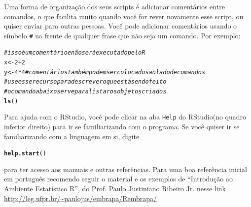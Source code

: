 \documentclass[a4paper,12pt]{article}\usepackage[]{graphicx}\usepackage[]{color}
\makeatletter
\newcommand{\hlnum}[1]{\textcolor[rgb]{0.686,0.059,0.569}{#1}}%
\newcommand{\hlcom}[1]{\textcolor[rgb]{0.498,0.498,0.498}{\textit{#1}}}%
\newcommand{\hlopt}[1]{\textcolor[rgb]{0,0,0}{#1}}%
\newcommand{\hlstd}[1]{\textcolor[rgb]{0.345,0.345,0.345}{#1}}%
\newcommand{\hlkwb}[1]{\textcolor[rgb]{0.69,0.353,0.396}{#1}}%
\newcommand{\hlkwd}[1]{\textcolor[rgb]{0.282,0.239,0.545}{\textbf{#1}}}%
\newenvironment{kframe}{%
 \def\at@end@of@kframe{}%
 \ifinner\ifhmode%
  \def\at@end@of@kframe{\end{minipage}}%
  \begin{minipage}{\columnwidth}%
 \fi\fi%
 \def\FrameCommand##1{\hskip\@totalleftmargin \hskip-\fboxsep
 \colorbox{shadecolor}{##1}\hskip-\fboxsep
     \hskip-\linewidth \hskip-\@totalleftmargin \hskip\columnwidth}%
 \MakeFramed {\advance\hsize-\width
   \@totalleftmargin\z@ \linewidth\hsize
   \@setminipage}}%
 {\par\unskip\endMakeFramed%
 \at@end@of@kframe}
\newenvironment{knitrout}{}{} %
\providecommand{\R}{\textsf{R}\xspace}
\providecommand{\RStudio}{\textsf{RStudio}\xspace}
\makeatother
\begin{document}
Uma forma de organização dos seus scripts é adicionar comentários entre
comandos, o que facilita muito quando você for rever novamente esse
script, ou quiser enviar para outras pessoas. Você pode adicionar
comentários usando o símbolo \texttt{\#} na frente de qualquer frase que
não seja um comando. Por exemplo:

\begin{knitrout}\small
{}\color{fgcolor}\begin{kframe}
\begin{alltt}
\hlstd{ }\hlcom{# isso é um comentário e não será executado pelo R}
\hlstd{ }\hlstd{x} \hlkwb{<-} \hlnum{2} \hlopt{+} \hlnum{2}
\hlstd{ }\hlstd{y} \hlkwb{<-} \hlnum{4} \hlopt{*} \hlnum{4} \hlcom{# comentários também podem ser colocados ao lado de comandos}
\hlstd{ }\hlcom{# use esse recurso para descrever o que está sendo feito}
\hlstd{ }\hlcom{# o comando abaixo serve para listar os objetos criados}
\hlstd{ }\hlkwd{ls}\hlstd{()}
\end{alltt}
\end{kframe}
\end{knitrout}


Para ajuda com o \RStudio, você pode clicar na aba \texttt{Help} do
\RStudio (no quadro inferior direito) para ir se familiarizando com o
programa. Se você quiser ir se familiarizando com a linguagem em si,
digite
\begin{knitrout}\small
{}\color{fgcolor}\begin{kframe}
\begin{alltt}
\hlstd{ }\hlkwd{help.start}\hlstd{()}
\end{alltt}
\end{kframe}
\end{knitrout}

\noindent para ter acesso aos manuais e outras referências. Para uma boa
referência inicial em português recomendo seguir o material e os
exemplos de ``Introdução ao Ambiente Estatístico R'', do Prof. Paulo
Justiniano Ribeiro Jr. nesse link
\url{http://leg.ufpr.br/~paulojus/embrapa/Rembrapa/}


\end{document}
